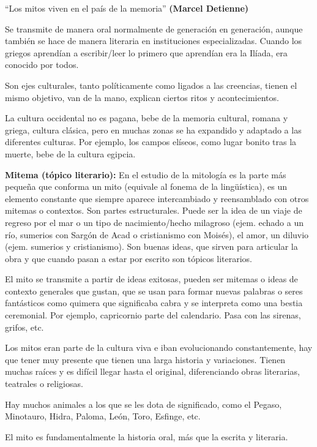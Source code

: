 \enquote{Los mitos viven en el país de la memoria} \textbf{(Marcel Detienne)}

Se transmite de manera oral normalmente de generación en generación, aunque también se hace de manera literaria en instituciones especializadas. Cuando los griegos aprendían a escribir/leer lo primero que aprendían era la Ilíada, era conocido por todos.

Son ejes culturales, tanto políticamente como ligados a las creencias, tienen el mismo objetivo, van de la mano, explican ciertos ritos y acontecimientos.

La cultura occidental no es pagana, bebe de la memoria cultural, romana y griega, cultura clásica, pero en muchas zonas se ha expandido y adaptado a las diferentes culturas. Por ejemplo, los campos elíseos, como lugar bonito tras la muerte, bebe de la cultura egipcia.

\textbf{Mitema (tópico literario):} En el estudio de la mitología es la parte más pequeña que conforma un mito (equivale al fonema de la lingüística), es un elemento constante que siempre aparece intercambiado y reensamblado con otros mitemas o contextos. Son partes estructurales. Puede ser la idea de un viaje de regreso por el mar o un tipo de nacimiento/hecho milagroso (ejem. echado a un río, sumerios con Sargón de Acad o cristianismo con Moisés), el amor, un diluvio (ejem. sumerios y cristianismo). Son buenas ideas, que sirven para articular la obra y que cuando pasan a estar por escrito son tópicos literarios.

El mito se transmite a partir de ideas exitosas, pueden ser mitemas o ideas de contexto generales que gustan, que se usan para formar nuevas palabras o seres fantásticos como quimera que significaba cabra y se interpreta como una bestia ceremonial. Por ejemplo, capricornio parte del calendario. Pasa con las sirenas, grifos, etc.

Los mitos eran parte de la cultura viva e iban evolucionando constantemente, hay que tener muy presente que tienen una larga historia y variaciones. Tienen muchas raíces y es difícil llegar hasta el original, diferenciando obras literarias, teatrales o religiosas.

Hay muchos animales a los que se les dota de significado, como el Pegaso, Minotauro, Hidra, Paloma, León, Toro, Esfinge, etc.

El mito es fundamentalmente la historia oral, más que la escrita y literaria.